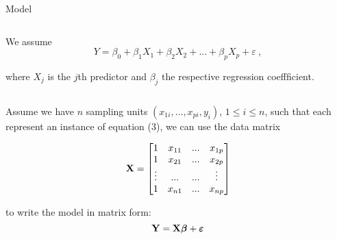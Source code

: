 \documentclass[10pt,ignorenonframetext,]{beamer}
\begin{document}
\begin{frame}

\begin{block}{Model}

\(~\)

We assume \begin{equation}
Y = \beta_0 + \beta_{1}  X_1 + \beta_2 X_2 + ... + \beta_p X_p + \varepsilon \ ,
\end{equation}

where \(X_j\) is the \(j\)th predictor and \(\beta_j\) the respective
regression coeffficient.

\(~\)

Assume we have \(n\) sampling units \((x_{1i},\ldots,x_{pi}, y_i)\),
\(1\leq i \leq n\), such that each represent an instance of equation
(3), we can use the data matrix

\[{\bf{X}} = \left[\begin{matrix} 1 & x_{11} & ... & x_{1p} \\
1 & x_{21} & ... & x_{2p} \\
\vdots  & ... & ... & \vdots \\
1 & x_{n1} & ... & x_{np} \\
\end{matrix}\right]\]

to write the model in matrix form:
\[{\bf Y}={\bf {X}} \boldsymbol{\beta}+{\boldsymbol{\varepsilon}} \]

\end{block}

\end{frame}
\end{document}
